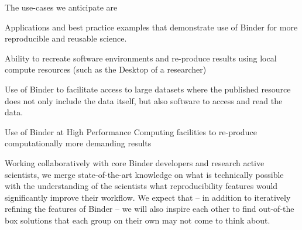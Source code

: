 \begin{workpackage}
\begin{wpdescription}
  The use-cases we anticipate are
  \begin{compactitem}
  \item {} Applications and best practice examples that
    demonstrate use of Binder for more reproducible and reusable science.
  \item {} Ability to recreate software environments
    and re-produce results using local compute resources (such as the Desktop of
    a researcher)
  \item {} Use of Binder to facilitate access to
    large datasets where the published resource does not only include the data
    itself, but also software to access and read the data.
  \item {} Use of Binder at High Performance Computing
    facilities to re-produce computationally more demanding results
  \end{compactitem}


  Working collaboratively with core Binder developers and research active
  scientists, we merge state-of-the-art knowledge on what is technically
  possible with the understanding of the scientists what reproducibility
  features would significantly improve their workflow. We expect that -- in
  addition to iteratively refining the features of Binder -- we will also
  inspire each other to find out-of-the box solutions that each group on
  their own may not come to think about.




\end{wpdescription}
\end{workpackage}
